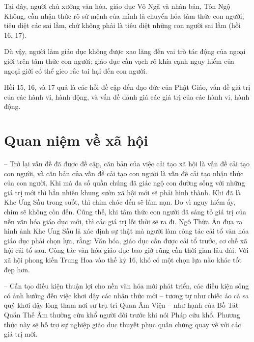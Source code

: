Tại đây, người chủ xướng văn hóa, giáo dục Vô Ngã và nhân bản, Tôn Ngộ Không, cần nhận thức rõ sứ mệnh của mình là chuyển hóa tâm thức con người, tiêu diệt các sai lầm, chứ không phải là tiêu diệt những con người sai lầm (hồi 16, 17).

Dù vậy, người làm giáo dục không được xao lãng đến vai trò tác động của ngoại giới trên tâm thức con người; giáo dục cần vạch rõ khía cạnh nguy hiểm của ngoại giới có thể gieo rắc tai hại đến con người.

Hồi 15, 16, và 17 quả là các hồi đề cập đến đạo đức của Phật Giáo, vấn đề giá trị của các hành vi, hành động, và vấn đề đánh giá các giá trị của các hành vi, hành động.

\section{Quan niệm về xã hội} %
\label{sec:15_xa_hoi}

-- Trở lại vấn đề đã được đề cập, căn bản của việc cải tạo xã hội là vấn đề cải tạo con người, và căn bản của vấn đề cải tạo con người là vấn đề cải tạo nhận thức của con người. Khi mà đa số quần chúng đã giác ngộ con đường sống với những giá trị mới thì hẳn nhiên khung sườn xã hội mới sẽ phải hình thành. Khi đã là Khe Ưng Sầu trong suốt, thì chim chóc đến sẽ lâm nạn. Do vì nguy hiểm ấy, chim sẽ không còn đến. Cũng thế, khi tâm thức con người đã sáng tỏ giá trị của nền văn hóa giáo dục mới, thì các giá trị lỗi thời sẽ ra đi. Ngô Thừa Ân đưa ra hình ảnh Khe Ưng Sầu là xác định sự thật mà người làm công tác cải tổ văn hóa giáo dục phải chọn lựa, rằng: Văn hóa, giáo dục cần được cải tổ trước, cơ chế xã hội cải tổ sau. Công tác văn hóa giáo dục bao giờ cũng cần thời gian lâu dài. Với xã hội phong kiến Trung Hoa vào thế kỷ 16, khó có một chọn lựa nào khác tốt đẹp hơn.

-- Cần tạo điều kiện thuận lợi cho nền văn hóa mới phát triển, các điều kiện sống có ảnh hưởng đến việc khơi dậy các nhận thức mới -- tương tự như chiếc áo cà sa quý khơi dậy lòng tham nơi sư trụ trì Quan Âm Viện -- như hạnh của Bồ Tát Quán Thế Âm thường cứu khổ người đời trước khi nói Pháp cứu khổ. Phương thức này sẽ hỗ trợ sự nghiệp giáo dục thuyết phục quần chúng quay về với các giá trị mới.
